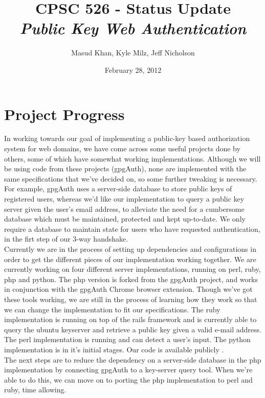 \documentclass[11pt]{article}
\begin{document}
\title{\bf CPSC 526 - Status Update \\ \emph{Public Key Web Authentication}}
\author{Masud Khan, Kyle Milz, Jeff Nicholson}
\date{February 28, 2012}
\maketitle

\tableofcontents
\pagebreak

\section{Project Progress}
In working towards our goal of implementing a public-key based authorization system for web domains, we have come across some useful projects done by others, some of which have somewhat working implementations.  Although we will be using code from these projects (gpgAuth\cite{gpgauth}), none are implemented with the same specifications that we've decided on, so some further tweaking is necessary.  For example, gpgAuth uses a server-side database to store public keys of registered users, whereas we'd like our implementation to query a public key server given the user's email address, to alleviate the need for a cumbersome database which must be maintained, protected and kept up-to-date. We only require a database to maintain state for users who have requested authentication, in the firt step of our 3-way handshake.\\
Currently we are in the process of setting up dependencies and configurations in order to get the different pieces of our implementation working together.  We are currently working on four different server implementations, running on perl, ruby, php and python.  The php version is forked from the gpgAuth project, and works in conjunction with the gpgAuth Chrome browser extension.  Though we've got these tools working, we are still in the process of learning how they work so that we can change the implementation to fit our specifications.  The ruby implementation is running on top of the rails framework and is currently able to query the ubuntu keyserver and retrieve a public key given a valid e-mail address.  The perl implementation is running and can detect a user's input. The python implementation is in it's initial stages. Our code is available publicly \cite{526proj}.\\
	The next steps are to reduce the dependency on a server-side database in the php implementation by connecting gpgAuth to a key-server query tool.  When we're able to do this, we can move on to porting the php implementation to perl and ruby, time allowing.  
\end{document}
